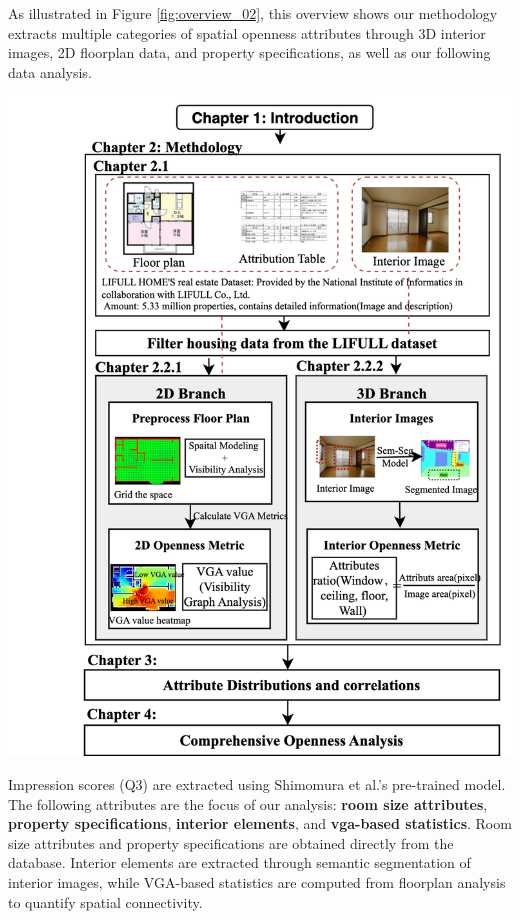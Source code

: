 \documentclass[11pt,a4paper]{article}
\begin{document}
\begin{multicols}{2}
As illustrated in Figure \ref{fig:overview_02}, this overview shows our methodology extracts multiple categories of spatial openness 
attributes through 3D interior images, 2D floorplan data, and property specifications, as well as our following data analysis. 
\begin{center}
    \includegraphics[width=1\columnwidth]{plots/overview.png}
    \label{fig:overview_02}
\end{center}
Impression scores (Q3) are extracted using Shimomura et al.'s pre-trained model.
The following attributes are the focus of our analysis:
\textbf{room size attributes}, \textbf{property specifications}, \textbf{interior elements}, and \textbf{vga-based statistics}.
Room size attributes and property specifications are obtained directly from the database.
Interior elements are extracted through semantic segmentation of interior images, 
while VGA-based statistics are computed from floorplan analysis to quantify spatial connectivity. 


\end{multicols}
\end{document}
